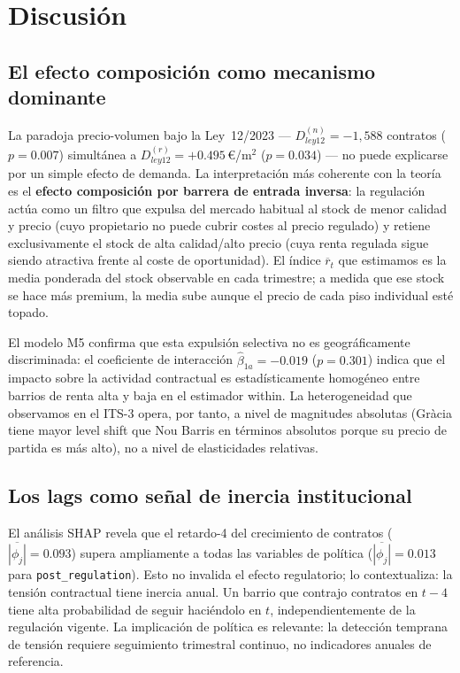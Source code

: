 \documentclass[10pt,a4paper,twocolumn]{article}
\begin{document}
\section{Discusión}
\label{sec:discusion}

\subsection{El efecto composición como mecanismo dominante}

La paradoja precio-volumen bajo la Ley~12/2023 --- $D_{ley12}^{(n)}{=}{-}1{,}588$
contratos ($p{=}0.007$) simultánea a $D_{ley12}^{(r)}{=}{+}0.495$\,\euro/m$^2$
($p{=}0.034$) --- no puede explicarse por un simple efecto de demanda. La
interpretación más coherente con la teoría es el \textbf{efecto composición por
barrera de entrada inversa}: la regulación actúa como un filtro que expulsa del
mercado habitual al stock de menor calidad y precio (cuyo propietario no puede cubrir
costes al precio regulado) y retiene exclusivamente el stock de alta calidad/alto
precio (cuya renta regulada sigue siendo atractiva frente al coste de oportunidad).
El índice $\overline{r}_t$ que estimamos es la media ponderada del stock observable
en cada trimestre; a medida que ese stock se hace más premium, la media sube aunque
el precio de cada piso individual esté topado.

El modelo M5 confirma que esta expulsión selectiva no es geográficamente discriminada:
el coeficiente de interacción $\hat\beta_{1a}{=}{-}0.019$ ($p{=}0.301$) indica que el
impacto sobre la actividad contractual es estadísticamente homogéneo entre barrios de
renta alta y baja en el estimador within. La heterogeneidad que observamos en el
ITS-3 opera, por tanto, a nivel de magnitudes absolutas (Gràcia tiene mayor level
shift que Nou Barris en términos absolutos porque su precio de partida es más alto),
no a nivel de elasticidades relativas.

\subsection{Los lags como señal de inercia institucional}

El análisis SHAP revela que el retardo-4 del crecimiento de contratos
($\overline{|\phi_j|}{=}0.093$) supera ampliamente a todas las variables de política
($\overline{|\phi_j|}{=}0.013$ para \texttt{post\_regulation}). Esto no invalida el
efecto regulatorio; lo contextualiza: la tensión contractual tiene inercia anual.
Un barrio que contrajo contratos en $t{-}4$ tiene alta probabilidad de seguir
haciéndolo en $t$, independientemente de la regulación vigente. La implicación de
política es relevante: la detección temprana de tensión requiere seguimiento trimestral
continuo, no indicadores anuales de referencia.
\end{document}
